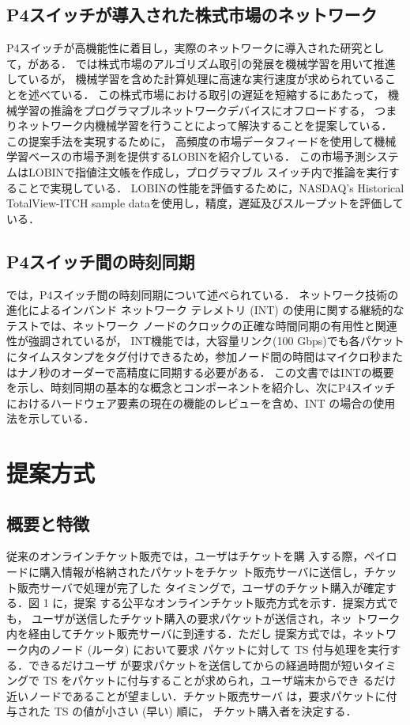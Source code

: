 \documentclass[a4j,11pt]{jreport}
\begin{document}
\section{P4スイッチが導入された株式市場のネットワーク}
P4スイッチが高機能性に着目し，実際のネットワークに導入された研究として，\cite{LOBIN}がある．
\cite{LOBIN}では株式市場のアルゴリズム取引の発展を機械学習を用いて推進しているが，
機械学習を含めた計算処理に高速な実行速度が求められていることを述べている．
この株式市場における取引の遅延を短縮するにあたって，
機械学習の推論をプログラマブルネットワークデバイスにオフロードする，
つまりネットワーク内機械学習を行うことによって解決することを提案している．
この提案手法を実現するために，
高頻度の市場データフィードを使用して機械学習ベースの市場予測を提供するLOBINを紹介している．
この市場予測システムはLOBINで指値注文帳を作成し，プログラマブル スイッチ内で推論を実行することで実現している．
LOBINの性能を評価するために，NASDAQ’s Historical TotalView-ITCH sample dataを使用し，精度，遅延及びスループットを評価している．

\section{P4スイッチ間の時刻同期}
\cite{Clock Synchronization}では，P4スイッチ間の時刻同期について述べられている．
ネットワーク技術の進化によるインバンド ネットワーク テレメトリ (INT) の使用に関する継続的なテストでは、ネットワーク ノードのクロックの正確な時間同期の有用性と関連性が強調されているが，
INT機能では，大容量リンク(100 Gbps)でも各パケットにタイムスタンプをタグ付けできるため，参加ノード間の時間はマイクロ秒またはナノ秒のオーダーで高精度に同期する必要がある．
この文書ではINTの概要を示し、時刻同期の基本的な概念とコンポーネントを紹介し、次にP4スイッチにおけるハードウェア要素の現在の機能のレビューを含め、INT の場合の使用法を示している．

\chapter{提案方式}

\section{概要と特徴}

従来のオンラインチケット販売では，ユーザはチケットを購
入する際，ペイロードに購入情報が格納されたパケットをチケッ
ト販売サーバに送信し，チケット販売サーバで処理が完了した
タイミングで，ユーザのチケット購入が確定する．図 1 に，提案
する公平なオンラインチケット販売方式を示す．提案方式でも，
ユーザが送信したチケット購入の要求パケットが送信され，ネッ
トワーク内を経由してチケット販売サーバに到達する．ただし
提案方式では，ネットワーク内のノード (ルータ) において要求
パケットに対して TS 付与処理を実行する．できるだけユーザ
が要求パケットを送信してからの経過時間が短いタイミングで
TS をパケットに付与することが求められ，ユーザ端末からでき
るだけ近いノードであることが望ましい．チケット販売サーバ
は，要求パケットに付与された TS の値が小さい (早い) 順に，
チケット購入者を決定する．
\end{document}
